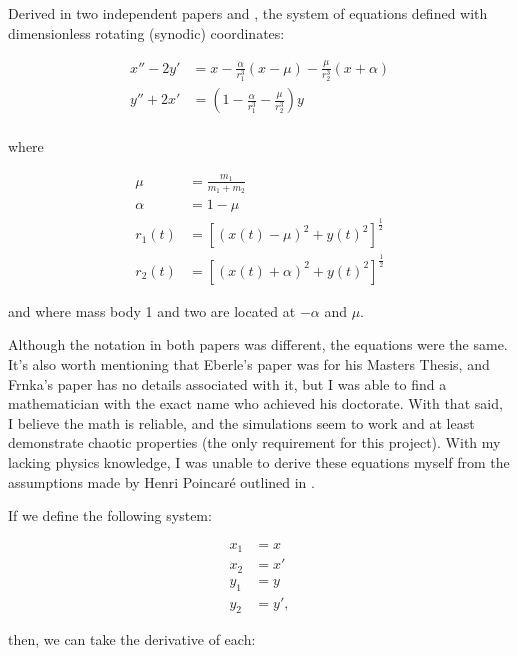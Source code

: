 \documentclass{article}
\begin{document}
Derived in two independent papers \cite{eberle2007case} and \cite{frnkacase},
the system of equations defined with dimensionless rotating (synodic)
coordinates:

\begin{align}
    x'' - 2 y' &= x
        - \frac{\alpha}{r_1^3} (x - \mu)
        - \frac{\mu}{r_2^3} (x + \alpha) \nonumber \\
    y'' + 2 x' &= \left(
        1 - \frac{\alpha}{r_1^3}
        - \frac{\mu}{r_2^3}
    \right) y \nonumber \\
\end{align}

where 

\begin{align}
    \mu &= \frac{m_1}{m_1 + m_2} \nonumber \\
    \alpha &= 1 - \mu \nonumber \\
    r_1(t) &= \left[(x(t) - \mu)^2 + y(t)^2\right]^{\frac{1}{2}} \nonumber \\
    r_2(t) &= \left[(x(t) + \alpha)^2 + y(t)^2\right]^{\frac{1}{2}} \label{eq:reduc_3body_cor}
\end{align}
 
and where mass body 1 and two are located at $-\alpha$ and $\mu$.

Although the notation in both papers was different, the equations were the same. 
It's also worth mentioning that Eberle's paper was for his Masters Thesis, and 
Frnka's paper has no details associated with it, but I was able to find a 
mathematician with the exact name who achieved his doctorate. With that said, 
I believe the math is reliable, and the simulations seem to work and at least 
demonstrate chaotic properties (the only requirement for this project). With my
lacking physics knowledge, I was unable to derive these equations myself from
the assumptions made by Henri Poincaré outlined in 
\cite{chenciner2000remarkable}.

If we define the following system:

\begin{align}
    x_1 &= x \nonumber \\
    x_2 &= x' \nonumber \\
    y_1 &= y \nonumber \\
    y_2 &= y', \label{eq:first_order_def}
\end{align}

then, we can take the derivative of each:
\end{document}
